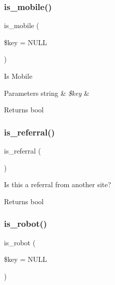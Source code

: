 \subsubsection{\texorpdfstring{is\+\_\+mobile()}{is\_mobile()}}
{\footnotesize\ttfamily is\+\_\+mobile (\begin{DoxyParamCaption}\item[{}]{\$key = {\ttfamily NULL} }\end{DoxyParamCaption})}

Is Mobile


\begin{DoxyParams}[1]{Parameters}
string & {\em \$key} & \\
\hline
\end{DoxyParams}
\begin{DoxyReturn}{Returns}
bool 
\end{DoxyReturn}
\mbox{\label{class_c_i___user__agent_ab2ec679c069f45c4265dade1e1097f17}} 
\subsubsection{\texorpdfstring{is\+\_\+referral()}{is\_referral()}}
{\footnotesize\ttfamily is\+\_\+referral (\begin{DoxyParamCaption}{ }\end{DoxyParamCaption})}

Is this a referral from another site?

\begin{DoxyReturn}{Returns}
bool 
\end{DoxyReturn}
\mbox{\label{class_c_i___user__agent_aaf9eed8184635473476a24f6a850815c}} 
\subsubsection{\texorpdfstring{is\+\_\+robot()}{is\_robot()}}
{\footnotesize\ttfamily is\+\_\+robot (\begin{DoxyParamCaption}\item[{}]{\$key = {\ttfamily NULL} }\end{DoxyParamCaption})}

